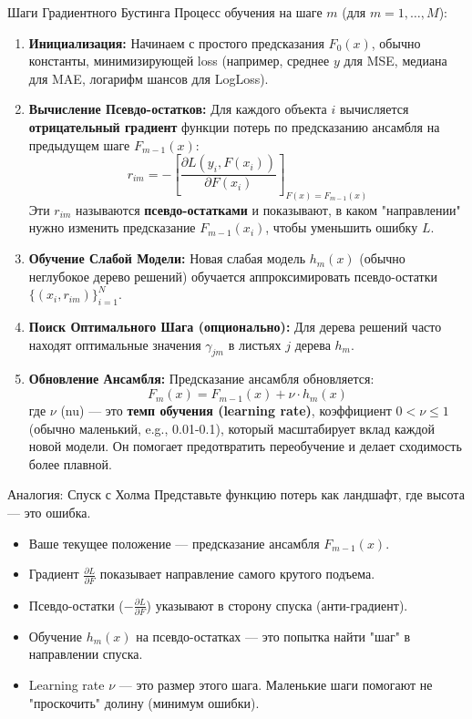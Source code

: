 \begin{myblock}{Шаги Градиентного Бустинга}
    Процесс обучения на шаге $m$ (для $m = 1, \dots, M$):
    \begin{enumerate}[label=\arabic*., wide, labelindent=0pt, itemsep=1ex]
        \item \textbf{Инициализация:} Начинаем с простого предсказания $F_0(x)$, обычно константы, минимизирующей loss (например, среднее $y$ для MSE, медиана для MAE, логарифм шансов для LogLoss).

        \item \textbf{Вычисление Псевдо-остатков:} Для каждого объекта $i$ вычисляется \textbf{отрицательный градиент} функции потерь по предсказанию ансамбля на предыдущем шаге $F_{m-1}(x)$:
          \[ r_{im} = - \left[ \frac{\partial L(y_i, F(x_i))}{\partial F(x_i)} \right]_{F(x) = F_{m-1}(x)} \]
          Эти $r_{im}$ называются \textbf{псевдо-остатками} и показывают, в каком "направлении" нужно изменить предсказание $F_{m-1}(x_i)$, чтобы уменьшить ошибку $L$.

        \item \textbf{Обучение Слабой Модели:} Новая слабая модель $h_m(x)$ (обычно неглубокое дерево решений) обучается аппроксимировать псевдо-остатки $\{ (x_i, r_{im}) \}_{i=1}^N$.

        \item \textbf{Поиск Оптимального Шага (опционально):} Для дерева решений часто находят оптимальные значения $\gamma_{jm}$ в листьях $j$ дерева $h_m$.

        \item \textbf{Обновление Ансамбля:} Предсказание ансамбля обновляется:
          \[ F_m(x) = F_{m-1}(x) + \nu \cdot h_m(x) \]
          где $\nu$ (nu) — это \textbf{темп обучения (learning rate)}, коэффициент $0 < \nu \le 1$ (обычно маленький, e.g., 0.01-0.1), который масштабирует вклад каждой новой модели. Он помогает предотвратить переобучение и делает сходимость более плавной.
    \end{enumerate}
\end{myblock}

\begin{textbox}{Аналогия: Спуск с Холма}
    Представьте функцию потерь как ландшафт, где высота — это ошибка.
    \begin{itemize}[nosep, leftmargin=*]
        \item Ваше текущее положение — предсказание ансамбля $F_{m-1}(x)$.
        \item Градиент $\frac{\partial L}{\partial F}$ показывает направление самого крутого подъема.
        \item Псевдо-остатки ($-\frac{\partial L}{\partial F}$) указывают в сторону спуска (анти-градиент).
        \item Обучение $h_m(x)$ на псевдо-остатках — это попытка найти "шаг" в направлении спуска.
        \item Learning rate $\nu$ — это размер этого шага. Маленькие шаги помогают не "проскочить" долину (минимум ошибки).
    \end{itemize}
\end{textbox}

